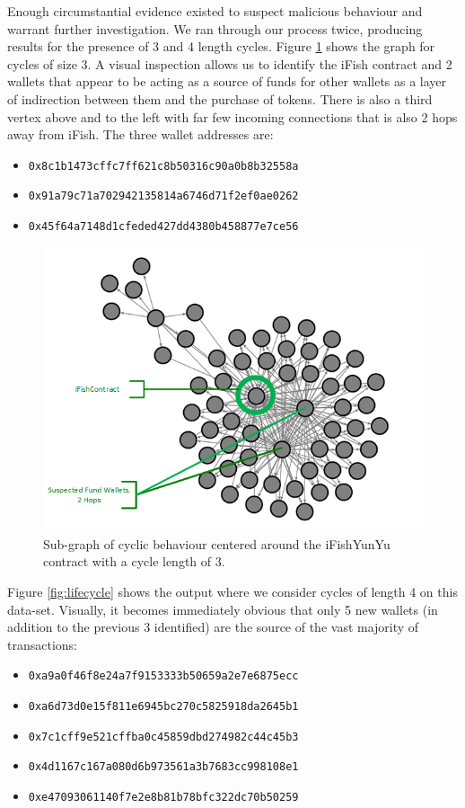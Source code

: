 \documentclass[conference]{IEEEtran}
\begin{document}
Enough circumstantial evidence existed to suspect malicious behaviour and warrant further investigation.  We ran through our process twice, producing results for the presence of 3 and 4 length cycles.  Figure \ref{fig:ifish3hop} shows the graph for cycles of size 3.  A visual inspection allows us to identify the iFish contract and 2 wallets that appear to be acting as a source of funds for other wallets as a layer of indirection between them and the purchase of tokens. There is also a third vertex above and to the left with far few incoming connections that is also 2 hops away from iFish.  The three wallet addresses are:

\begin{itemize}
    \item {\tiny\texttt{0x8c1b1473cffc7ff621c8b50316c90a0b8b32558a}}
    \item {\tiny\texttt{0x91a79c71a702942135814a6746d71f2ef0ae0262}}
    \item {\tiny\texttt{0x45f64a7148d1cfeded427dd4380b458877e7ce56}}
\end{itemize}

\begin{figure}
    \centering
    \includegraphics[width=0.8\columnwidth]{images/iFish3hop.png}
    \caption{Sub-graph of cyclic behaviour centered around the iFishYunYu contract with a cycle length of 3.}
    \label{fig:ifish3hop}
\end{figure}

Figure \ref{fig:lifecycle} shows the output where we consider cycles of length 4 on this data-set.   Visually, it becomes immediately obvious that only 5 new wallets (in addition to the previous 3 identified) are the source of the vast majority of transactions:

\begin{itemize}
    \item {\tiny\texttt{0xa9a0f46f8e24a7f9153333b50659a2e7e6875ecc}}
    \item {\tiny\texttt{0xa6d73d0e15f811e6945bc270c5825918da2645b1}}
    \item {\tiny\texttt{0x7c1cff9e521cffba0c45859dbd274982c44c45b3}}
    \item {\tiny\texttt{0x4d1167c167a080d6b973561a3b7683cc998108e1}}
    \item {\tiny\texttt{0xe47093061140f7e2e8b81b78bfc322dc70b50259}}
\end{itemize}
\end{document}
